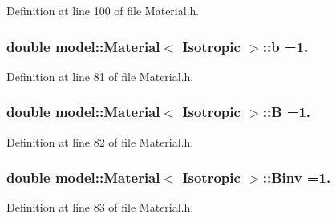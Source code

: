 Definition at line 100 of file Material.\+h.

\hypertarget{classmodel_1_1_material_3_01_isotropic_01_4_a8d27809d336e9e463000877b5af8cba2}{}
\subsubsection[{b}]{\setlength{\rightskip}{0pt plus 5cm}double {\bf model\+::\+Material}$<$ {\bf Isotropic} $>$\+::b =1.\hspace{0.3cm}{\ttfamily [static]}}\label{classmodel_1_1_material_3_01_isotropic_01_4_a8d27809d336e9e463000877b5af8cba2}


Definition at line 81 of file Material.\+h.

\hypertarget{classmodel_1_1_material_3_01_isotropic_01_4_abff932e0b33c9e4b8d58f7bb9b1c5672}{}
\subsubsection[{B}]{\setlength{\rightskip}{0pt plus 5cm}double {\bf model\+::\+Material}$<$ {\bf Isotropic} $>$\+::B =1.\hspace{0.3cm}{\ttfamily [static]}}\label{classmodel_1_1_material_3_01_isotropic_01_4_abff932e0b33c9e4b8d58f7bb9b1c5672}


Definition at line 82 of file Material.\+h.

\hypertarget{classmodel_1_1_material_3_01_isotropic_01_4_a8cafb424a37398ed2466c9231e6dfe3d}{}
\subsubsection[{Binv}]{\setlength{\rightskip}{0pt plus 5cm}double {\bf model\+::\+Material}$<$ {\bf Isotropic} $>$\+::Binv =1.\hspace{0.3cm}{\ttfamily [static]}}\label{classmodel_1_1_material_3_01_isotropic_01_4_a8cafb424a37398ed2466c9231e6dfe3d}


Definition at line 83 of file Material.\+h.

